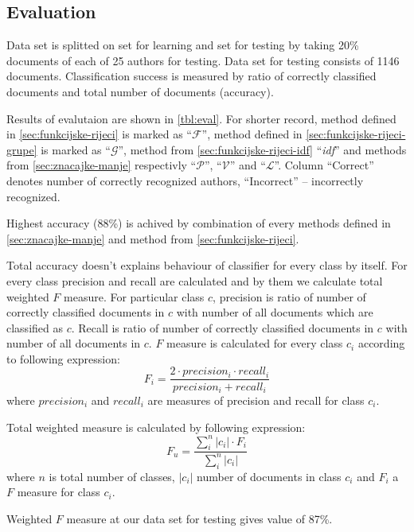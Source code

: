 \documentclass[11pt,english]{article}
\begin{document}
\begin{multicols}{2}
\section{Evaluation}
\label{sec:evaluacija}
Data set is splitted on set for learning and set for testing by taking 20\%
documents of each of 25 authors for testing. Data set for testing consists of
1146 documents. Classification success is measured by ratio of correctly
classified documents and total number of documents (accuracy).

Results of evalutaion are shown in \ref{tbl:eval}. For shorter record, method
defined in \ref{sec:funkcijske-rijeci} is marked as ``$\mathcal{F}$'', method
defined in \ref{sec:funkcijske-rijeci-grupe} is marked as ``$\mathcal{G}$'',
method from \ref{sec:funkcijske-rijeci-idf} ``\emph{idf}'' and methods from
\ref{sec:znacajke-manje} respectivly ``$\mathcal{P}$'', ``$\mathcal{V}$'' and
``$\mathcal{L}$''. Column ``Correct'' denotes number of correctly
recognized authors, ``Incorrect'' -- incorrectly recognized.

Highest accuracy (88\%) is achived by combination of every methods defined in
\ref{sec:znacajke-manje} and method from \ref{sec:funkcijske-rijeci}.

Total accuracy doesn't explains behaviour of classifier for every class by
itself. For every class precision and recall are calculated and by them we
calculate total weighted $F$ measure. For particular class $c$, precision is
ratio of number of correctly classified documents in $c$ with number of all
documents which are classified as $c$. Recall is ratio of number of correctly
classified documents in $c$ with number of all documents in $c$. $F$ measure is
calculated for every class $c_i$ according to following expression:
\begin{equation}
F_i = \frac{2 \cdot precision_i \cdot recall_i}{precision_i + recall_i}
\end{equation}
where $precision_i$ and $recall_i$ are measures of precision and recall for
class $c_i$.

Total weighted measure is calculated by following expression:
\begin{equation}
F_u = \frac{\sum^{n}_i |c_i|\cdot F_i}{\sum^n_i|c_i|}
\end{equation}
where $n$ is total number of classes, $|c_i|$ number of documents in class
$c_i$ and $F_i$ a $F$ measure for class $c_i$.

Weighted $F$ measure at our data set for testing gives value of 87\%.


\end{multicols}
\end{document}
